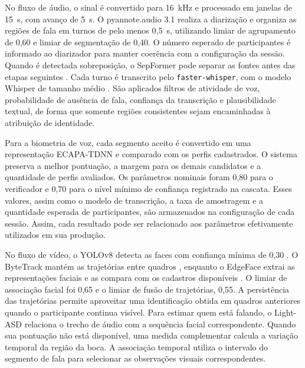 \documentclass[a4paper,11pt]{article}
\begin{document}
No fluxo de áudio, o sinal é convertido para 16~kHz e processado em janelas de 15~s, com avanço de 5~s. O pyannote.audio 3.1 realiza a diarização e organiza as regiões de fala em turnos de pelo menos 0,5~s, utilizando limiar de agrupamento de 0,60 e limiar de segmentação de 0,40. O número esperado de participantes é informado ao diarizador para manter coerência com a configuração da sessão. Quando é detectada sobreposição, o SepFormer pode separar as fontes antes das etapas seguintes \cite{subakan2021}. Cada turno é transcrito pelo \texttt{faster-whisper}, com o modelo Whisper de tamanho médio \cite{radford2023}. São aplicados filtros de atividade de voz, probabilidade de ausência de fala, confiança da transcrição e plausibilidade textual, de forma que somente regiões consistentes sejam encaminhadas à atribuição de identidade.

Para a biometria de voz, cada segmento aceito é convertido em uma representação ECAPA-TDNN e comparado com os perfis cadastrados. O sistema preserva a melhor pontuação, a margem para os demais candidatos e a quantidade de perfis avaliados. Os parâmetros nominais foram 0,80 para o verificador e 0,70 para o nível mínimo de confiança registrado na cascata. Esses valores, assim como o modelo de transcrição, a taxa de amostragem e a quantidade esperada de participantes, são armazenados na configuração de cada sessão. Assim, cada resultado pode ser relacionado aos parâmetros efetivamente utilizados em sua produção.

No fluxo de vídeo, o YOLOv8 detecta as faces com confiança mínima de 0,30 \cite{jocher2023}. O ByteTrack mantém as trajetórias entre quadros \cite{zhang2022}, enquanto o EdgeFace extrai as representações faciais e as compara com os cadastros disponíveis \cite{george2024}. O limiar de associação facial foi 0,65 e o limiar de fusão de trajetórias, 0,55. A persistência das trajetórias permite aproveitar uma identificação obtida em quadros anteriores quando o participante continua visível. Para estimar quem está falando, o Light-ASD relaciona o trecho de áudio com a sequência facial correspondente. Quando sua pontuação não está disponível, uma medida complementar calcula a variação temporal da região da boca. A associação temporal utiliza o intervalo do segmento de fala para selecionar as observações visuais correspondentes.
\end{document}

